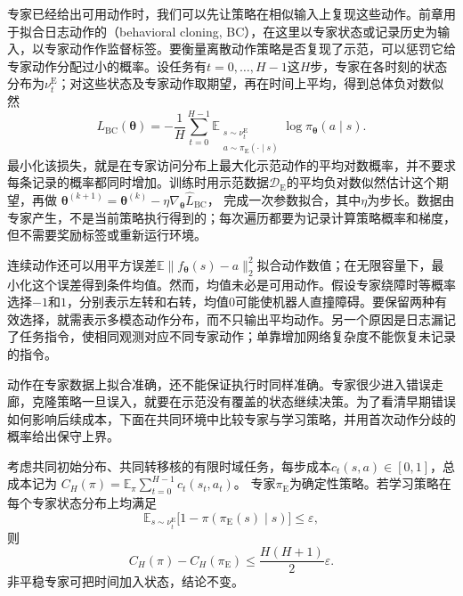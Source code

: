 专家已经给出可用动作时，我们可以先让策略在相似输入上复现这些动作。前章用于拟合日志动作的（behavioral cloning, BC），在这里以专家状态或记录历史为输入，以专家动作作监督标签。要衡量离散动作策略是否复现了示范，可以惩罚它给专家动作分配过小的概率。设任务有$t=0,\ldots,H-1$这$H$步，专家在各时刻的状态分布为$\nu_t^{\mathrm E}$；对这些状态及专家动作取期望，再在时间上平均，得到总体负对数似然
\begin{equation}
  L_{\mathrm{BC}}(\bm{\theta})
  =-\frac1H\sum_{t=0}^{H-1}
  \mathbb E_{\substack{s\sim\nu_t^{\mathrm E}\\
              a\sim\pi_{\mathrm E}(\cdot\mid s)}}
       \log\pi_{\bm{\theta}}(a\mid s).
  \label{eq:rl-reward-bc}
\end{equation}
最小化该损失，就是在专家访问分布上最大化示范动作的平均对数概率，并不要求每条记录的概率都同时增加。训练时用示范数据$\mathcal D_{\mathrm E}$的平均负对数似然估计这个期望，再做
$\bm{\theta}^{(k+1)}=\bm{\theta}^{(k)}
-\eta\nabla_{\bm{\theta}}\widehat L_{\mathrm{BC}}$，
完成一次参数拟合，其中$\eta$为步长。数据由专家产生，不是当前策略执行得到的；每次遍历都要为记录计算策略概率和梯度，但不需要奖励标签或重新运行环境。

连续动作还可以用平方误差$\mathbb E\lVert f_{\bm{\theta}}(s)-a\rVert_2^2$拟合动作数值；在无限容量下，最小化这个误差得到条件均值。然而，均值未必是可用动作。假设专家绕障时等概率选择$-1$和$1$，分别表示左转和右转，均值$0$可能使机器人直撞障碍。要保留两种有效选择，就需表示多模态动作分布，而不只输出平均动作。另一个原因是日志漏记了任务指令，使相同观测对应不同专家动作；单靠增加网络复杂度不能恢复未记录的指令。

动作在专家数据上拟合准确，还不能保证执行时同样准确。专家很少进入错误走廊，克隆策略一旦误入，就要在示范没有覆盖的状态继续决策。为了看清早期错误如何影响后续成本，下面在共同环境中比较专家与学习策略，并用首次动作分歧的概率给出保守上界。

\begin{theorem}[行为克隆的首次分歧界]
  \label{thm:rl-reward-bc}
  考虑共同初始分布、共同转移核的有限时域任务，每步成本$c_t(s,a)\in[0,1]$，总成本记为
  $C_H(\pi)=\mathbb E_\pi\sum_{t=0}^{H-1}c_t(s_t,a_t)$。
  专家$\pi_{\mathrm E}$为确定性策略。若学习策略在每个专家状态分布上均满足
  \[
    \mathbb E_{s\sim\nu_t^{\mathrm E}}
    \bigl[1-\pi(\pi_{\mathrm E}(s)\mid s)\bigr]\leq\varepsilon,
  \]
  则
  \[
    C_H(\pi)-C_H(\pi_{\mathrm E})
    \leq \frac{H(H+1)}2\varepsilon.
  \]
  非平稳专家可把时间加入状态，结论不变。
\end{theorem}

